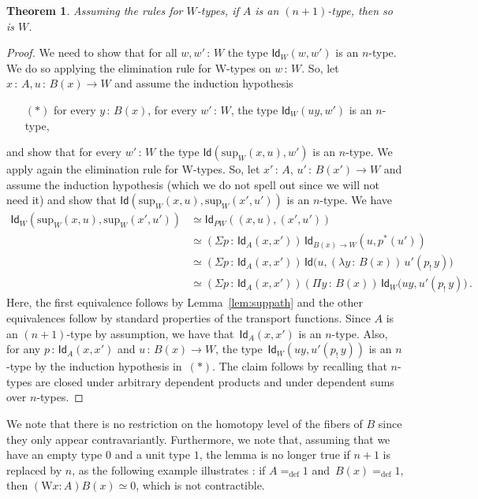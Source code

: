 \documentclass[10pt,a4paper,oneside,reqno]{amsart}
\numberwithin{equation}{section}
\theoremstyle{mythm}
\newtheorem{theorem}{Theorem}[section]
\theoremstyle{mydef}
\theoremstyle{myrmk}
\newcommand{\defeq}{=_{\mathrm{def}}}
\newcommand{\co}{\,{:}\,}
\newcommand{\Id}{\mathsf{Id}}
\newcommand{\W}{\mathrm{W}}
\renewcommand{\sup}{\mathrm{sup}}
\begin{document}
\begin{theorem} Assuming the rules for $W$-types,
if $A$ is an $(n+1)$-type, then so is $W$.
\end{theorem}


\begin{proof}
We need to show that for all $w, w' \co W$ the type $\Id_W(w, w')$ is an $n$-type. We do so applying the elimination
rule for W-types on $w \co W$.  So, let $x \co A, u \co B(x) \to W$ and assume the induction hypothesis 
\begin{itemize}
\item[$(\ast)$] for every $y \co B(x)$, for every $w' \co W$,  the type $\Id_W( uy ,w')$ is an $n$-type, 
\end{itemize}
and show that for every $w' \co W$ the type $\Id(\sup_W(x,u), w')$ is an $n$-type. We apply again the elimination rule for W-types. So, let   $x' \co A$, $u' \co B(x') \to W$ and assume the induction hypothesis (which we do not spell out since we will not need it) and show that $\Id( \sup_W(x,u) , \sup_W(x',u'))$ is an $n$-type. We have
\begin{align*} 
\Id_W(\sup_W(x,u), \sup_W(x',u'))
& \simeq \Id_{PW}((x,u) , (x',u')) \\
& \simeq (\Sigma p \co \Id_A(x, x')) \, \Id_{B(x) \to W}( u , p^*(u') )   \\
& \simeq (\Sigma p \co \Id_A(x,x')) \,  \Id\big(u , (\lambda y \co B(x)) \,  u'( p_{!} \, y)\big) \\
& \simeq (\Sigma p \co \Id_A(x,x')) (\Pi y \co B(x)) \, \Id_W \big( uy  , u'(p_{!} \, y)\big) \, .
\end{align*}
Here, the first equivalence follows by Lemma~\ref{lem:suppath} and the other equivalences follow by standard
properties of the transport functions. Since $A$ is an $(n+1)$-type by assumption, we have 
that~$\Id_A(x,x')$ is an $n$-type. Also, for any $p \co \Id_A(x,x')$ and $u \co B(x) \to W$, the 
type~$\Id_W(uy ,  u'(p_{!} \, y))$ is an $n$-type by the 
induction 
hypothesis in~$(\ast)$. The claim follows by recalling that $n$-types are closed under arbitrary dependent products and under dependent 
sums over $n$-types. 
\end{proof}

We note that there is no restriction on the homotopy level of the fibers of $B$ since they only appear contravariantly. Furthermore, we note that, assuming that we have an empty type $0$ and a unit type $1$,
 the lemma is no longer true if $n+1$ is replaced by $n$, as the following example
illustrates : if $A \defeq 1$ and~$B(x) \defeq 1$, then $(\W x:A) B(x) \simeq 0$, which is not contractible. 
\end{document}

